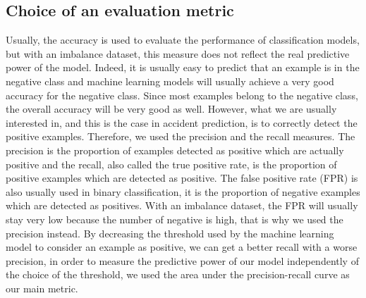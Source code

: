 \documentclass[conference]{IEEEtran}
\begin{document}
\subsection{Choice of an evaluation metric}
Usually, the accuracy is used to evaluate the performance of classification models, but with an imbalance dataset, this measure does not reflect the real predictive power of the model. Indeed, it is usually easy to predict that an example is in the negative class and machine learning models will usually achieve a very good accuracy for the negative class. Since most examples belong to the negative class, the overall accuracy will be very good as well. However, what we are usually interested in, and this is the case in accident prediction, is to correctly detect the positive examples.
Therefore, we used the precision and the recall measures. The precision is the proportion of examples detected as positive which are actually positive and the recall, also called the true positive rate, is the proportion of positive examples which are detected as positive. The false positive rate (FPR) is also usually used in binary classification, it is the proportion of negative examples which are detected as positives. With an imbalance dataset, the FPR will usually stay very low because the number of negative is high, that is why we used the precision instead.
By decreasing the threshold used by the machine learning model to consider an example as positive, we can get a better recall with a worse precision, in order to measure the predictive power of our model independently of the choice of the threshold, we used the area under the precision-recall curve as our main metric.
\end{document}
